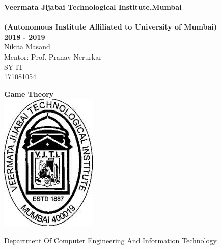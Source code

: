 \documentclass[letterpaper,12pt,oneside]{report}
\begin{document}
\begin{center}
\large{\textbf{
Veermata Jijabai Technological Institute,Mumbai\\
\\ 
        (Autonomous Institute Affiliated to University of Mumbai)\\
               2018 - 2019} \\
\vspace{15mm}
}
\Large{
Nikita Masand\\
Mentor: Prof. Pranav Nerurkar\\
SY IT\\
171081054\\
\vspace{15mm}
}
\par
\Huge{
\textbf{Game Theory}\\
}
\vspace{8mm}
\includegraphics[]{logo.jpeg}
\par

\Large{
\vspace{25mm}
Department Of Computer Engineering And Information Technology\\
}
\end{center}
\end{document}
